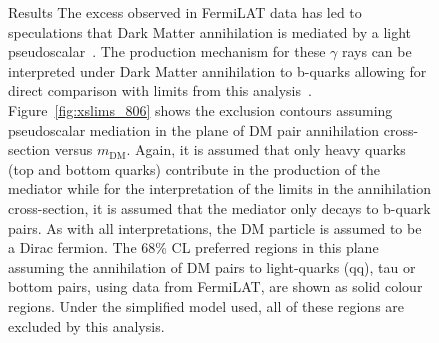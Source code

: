 \begin{figure}[hbtp]
\begin{section}{Results}
The excess observed in FermiLAT data has led to speculations that Dark Matter
annihilation is mediated by a light pseudoscalar~\cite{Calore:2014nla}.  The
production mechanism for these $\gamma$ rays can be interpreted under Dark
Matter annihilation to b-quarks allowing for direct comparison with limits from
this analysis~\cite{Buchmueller:2015eea,Buckley:2014fba,Harris:2014hga}.
Figure~\ref{fig:xslims_806} shows the exclusion contours assuming pseudoscalar
mediation in the plane of DM pair annihilation cross-section versus
$m_{\textrm{DM}}$.  Again, it is assumed that only heavy quarks (top and bottom
quarks) contribute in the production of the mediator while for  the
interpretation of the limits in the annihilation cross-section, it is assumed
that the mediator only decays to b-quark pairs. 
As with all interpretations, the DM particle is assumed to be a Dirac fermion.
The 68\% CL preferred regions in this plane assuming the annihilation of DM
pairs to light-quarks (qq), tau or bottom pairs, using data from FermiLAT, are
shown as solid colour regions. Under the simplified model used, all of these
regions are excluded by this analysis.



\end{section}
\end{figure}
